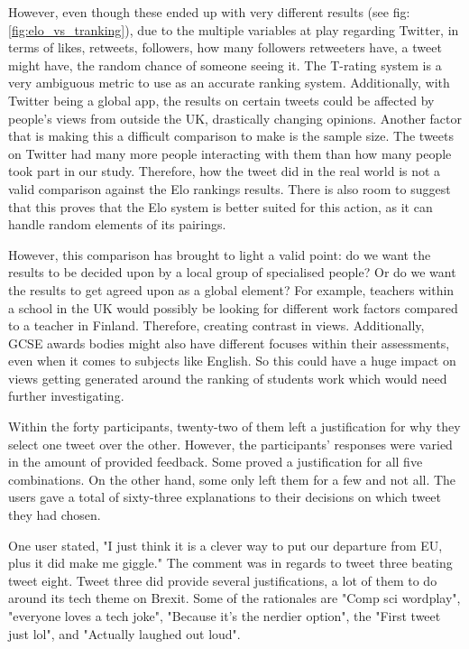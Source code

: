	However, even though these ended up with very different results (see fig: \ref{fig:elo_vs_tranking}), due to the multiple variables at play regarding Twitter, in terms of likes, retweets, followers, how many followers retweeters have, a tweet might have, the random chance of someone seeing it. The T-rating system is a very ambiguous metric to use as an accurate ranking system. Additionally, with Twitter being a global app, the results on certain tweets could be affected by people's views from outside the UK, drastically changing opinions. Another factor that is making this a difficult comparison to make is the sample size. The tweets on Twitter had many more people interacting with them than how many people took part in our study. Therefore, how the tweet did in the real world is not a valid comparison against the Elo rankings results. There is also room to suggest that this proves that the Elo system is better suited for this action, as it can handle random elements of its pairings. 
	
	However, this comparison has brought to light a valid point: do we want the results to be decided upon by a local group of specialised people? Or do we want the results to get agreed upon as a global element? For example, teachers within a school in the UK would possibly be looking for different work factors compared to a teacher in Finland. Therefore, creating contrast in views. Additionally, GCSE awards bodies might also have different focuses within their assessments, even when it comes to subjects like English. So this could have a huge impact on views getting generated around the ranking of students work which would need further investigating.

	Within the forty participants, twenty-two of them left a justification for why they select one tweet over the other. However, the participants' responses were varied in the amount of provided feedback. Some proved a justification for all five combinations. On the other hand, some only left them for a few and not all. The users gave a total of sixty-three explanations to their decisions on which tweet they had chosen.
	
	One user stated, "I just think it is a clever way to put our departure from EU, plus it did make me giggle." The comment was in regards to tweet three beating tweet eight. Tweet three did provide several justifications, a lot of them to do around its tech theme on Brexit. Some of the rationales are "Comp sci wordplay", "everyone loves a tech joke", "Because it's the nerdier option", the "First tweet just lol", and "Actually laughed out loud".
	
